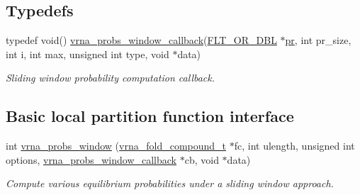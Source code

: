 \subsection*{Typedefs}
\begin{DoxyCompactItemize}
\item 
typedef void() \hyperlink{group__part__func__window_gabe710a1182e6db69cc75329dfc9bed67}{vrna\+\_\+probs\+\_\+window\+\_\+callback}(\hyperlink{group__data__structures_ga31125aeace516926bf7f251f759b6126}{F\+L\+T\+\_\+\+O\+R\+\_\+\+D\+BL} $\ast$\hyperlink{fold__vars_8h_ac98ec419070aee6831b44e5c700f090f}{pr}, int pr\+\_\+size, int i, int max, unsigned int type, void $\ast$data)
\begin{DoxyCompactList}\small\item\em Sliding window probability computation callback. \end{DoxyCompactList}\end{DoxyCompactItemize}
\subsection*{Basic local partition function interface}
\begin{DoxyCompactItemize}
\item 
int \hyperlink{group__part__func__window_ga7115d012988541a65ec323c5f17a334b}{vrna\+\_\+probs\+\_\+window} (\hyperlink{group__fold__compound_ga1b0cef17fd40466cef5968eaeeff6166}{vrna\+\_\+fold\+\_\+compound\+\_\+t} $\ast$fc, int ulength, unsigned int options, \hyperlink{group__part__func__window_gabe710a1182e6db69cc75329dfc9bed67}{vrna\+\_\+probs\+\_\+window\+\_\+callback} $\ast$cb, void $\ast$data)
\begin{DoxyCompactList}\small\item\em Compute various equilibrium probabilities under a sliding window approach. \end{DoxyCompactList}\end{DoxyCompactItemize}
